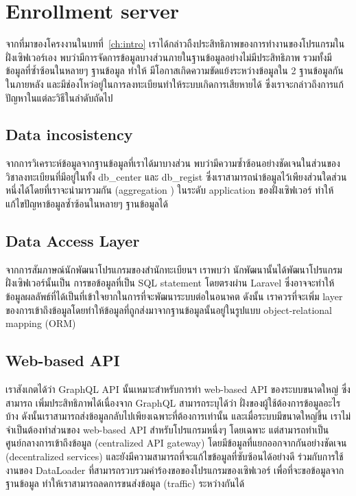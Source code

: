 \section{Enrollment server}

จากที่มาของโครงงานในบทที่~\ref{ch:intro} เราได้กล่าวถืงประสิทธิภาพของการทำงานของโปรแกรมในฝั่งเซิฟเวอร์เอง พบว่ามีการจัดการข้อมูลบางส่วนภายในฐานข้อมูลอย่างไม่มีประสิทธิภาพ รวมทั้งมีข้อมูลที่ซ้ำซ้อนในหลายๆ ฐานข้อมูล ทำให้ มีโอกาสเกิดความขัดแย้งระหว่างข้อมูลใน 2 ฐานข้อมูลกันในภายหลัง และมีช่องโหว่อยู่ในการลงทะเบียนทำให้ระบบเกิดการเสียหายได้ ซึ่งเราจะกล่าวถึงการแก้ปัญหาในแต่ละวิธีในลำดับถัดไป

\subsection{Data incosistency}

จากการวิเคราะห์ข้อมูลจากฐานข้อมูลที่เราได้มาบางส่วน พบว่ามีความซ้ำซ้อนอย่างชัดเจนในส่วนของวิชาลงทะเบียนที่มีอยู่ในทั้ง db\_center และ db\_regist ซึ่งเราสามารถนำข้อมูลไว้เพียงส่วนใดส่วนหนึ่งได้โดยที่เราจะนำมารวมกัน (aggregation \cite{aggregation}) ในระดับ application ของฝั่งเซิฟเวอร์ ทำให้แก้ไขปัญหาข้อมูลซ้ำซ้อนในหลายๆ ฐานข้อมูลได้

\subsection{Data Access Layer}

จากการสัมภาษณ์นักพัฒนาโปรแกรมของสำนักทะเบียนฯ เราพบว่า นักพัฒนานั้นได้พัฒนาโปรแกรมฝั่งเซิฟเวอร์นั้นเป็น การขอข้อมูลที่เป็น SQL statement โดยตรงผ่าน Laravel ซึ่งอาจจะทำให้ข้อมูลผลลัพธ์ที่ได้เป็นที่เข้าใจยากในการที่จะพัฒนาระบบต่อในอนาคต ดังนั้น เราควรที่จะเพิ่ม layer ของการเข้าถึงข้อมูลโดยทำให้ข้อมูลที่ถูกส่งมาจากฐานข้อมูลนั้นอยู่ในรูปแบบ object-relational mapping (ORM) \cite{orm}

\subsection{Web-based API}

เราสังเกตได้ว่า GraphQL API \cite{graphql} นั้นเหมาะสำหรับการทำ web-based API ของระบบขนาดใหญ่ ซึ่งสามารถ เพิ่มประสิทธิภาพได้เนื่องจาก GraphQL สามารถระบุได้ว่า ฝั่งของผู้ใช้ต้องการข้อมูลอะไรบ้าง ดังนั้นเราสามารถส่งข้อมูลกลับไปเพียงเฉพาะที่ต้องการเท่านั้น และเมื่อระบบมีขนาดใหญ่ขึ้น เราไม่จำเป็นต้องทำส่วนของ web-based API สำหรับโปรแกรมหนึ่งๆ โดยเฉพาะ แต่สามารถทำเป็นศูนย์กลางการเข้าถึงข้อมูล (centralized API gateway) โดยมีข้อมูลที่แยกออกจากกันอย่างชัดเจน (decentralized services) และยังมีความสามารถที่จะแก้ไขข้อมูลที่ซับซ้อนได้อย่างดี \cite{graphqlexec} ร่วมกับการใช้งานของ DataLoader ที่สามารถรวบรวมคำร้องขอของโปรแกรมของเซิฟเวอร์ เพื่อที่จะขอข้อมูลจากฐานข้อมูล ทำให้เราสามารถลดการขนส่งข้อมูล (traffic) ระหว่างกันได้


